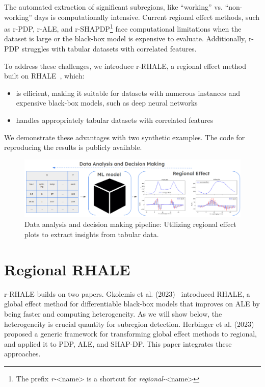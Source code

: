 \documentclass[
twocolumn,
]{ceurart}
\begin{document}
The automated extraction of significant subregions, like ``working'' vs. ``non-working'' days is computationally intensive. Current regional effect methods, such as r-PDP, r-ALE, and r-SHAPDP\footnote{The prefix \textit{r-}<name> is a shortcut for \textit{regional-}<name>} face computational limitations when the dataset is large or the black-box model is expensive to evaluate. Additionally, r-PDP struggles with tabular datasets with correlated features.

To address these challenges, we introduce r-RHALE, a regional effect method built on RHALE~\cite{gkolemis2023rhale, gkolemis22a}, which:

\begin{itemize}
\item is efficient, making it suitable for datasets with numerous instances and expensive black-box models, such as deep neural networks
\item handles appropriately tabular datasets with correlated features
\end{itemize}

We demonstrate these advantages with two synthetic examples. The code for reproducing the results is publicly available.

\begin{figure}[t]
    \centering
    \includegraphics[width=\textwidth]{figures/concept_image.png}
    \caption{Data analysis and decision making pipeline: Utilizing regional effect plots to extract insights from tabular data.}
    \label{fig:concept_figure}
\end{figure}

\section{Regional RHALE}

r-RHALE builds on two papers. Gkolemis et al. (2023)~\citep{gkolemis2023rhale} introduced RHALE, a global effect method for differentiable black-box models that improves on ALE by being faster and computing heterogeneity. As we will show below, the heterogeneity is crucial quantity for subregion detection. Herbinger et al. (2023)~\citep{herbinger2023decomposing} proposed a generic framework for transforming global effect methods to regional, and applied it to PDP\cite{friedman_predictive_2008}, ALE\cite{apley_visualizing_2020}, and SHAP-DP\cite{lundberg2017unified}. This paper integrates these approaches.
\end{document}

